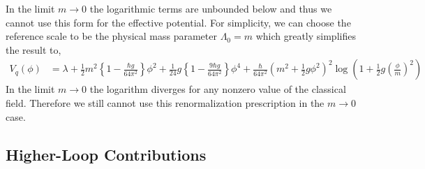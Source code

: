 \documentclass[12pt]{article}
\begin{document}
In the limit $m \to 0$ the logarithmic terms are unbounded below and thus we cannot use this form for the effective potential. For simplicity, we can choose the reference scale to be the physical mass parameter $\Lambda_0 = m$ which greatly simplifies the result to,
\begin{align*}
V_q(\phi) & = \lambda + \frac{1}{2} m^2 \left\{ 1 - \frac{\hbar g}{64 \pi^2} \right\} \phi^2 + \frac{1}{24} g  \left\{ 1 - \frac{9\hbar g}{64 \pi^2} \right\} \phi^4 + \frac{\hbar}{64 \pi^2} \left(m^2 + \tfrac{1}{2}  g \phi^2 \right)^2 \log{\left( 1 + \frac{1}{2} g \left( \frac{\phi}{m} \right)^2 \right)} 
\end{align*}
In the limit $m \to 0$ the logarithm diverges for any nonzero value of the classical field. Therefore we still cannot use this renormalization prescription in the $m \to 0$ case. 

\subsection{Higher-Loop Contributions}
\end{document}
